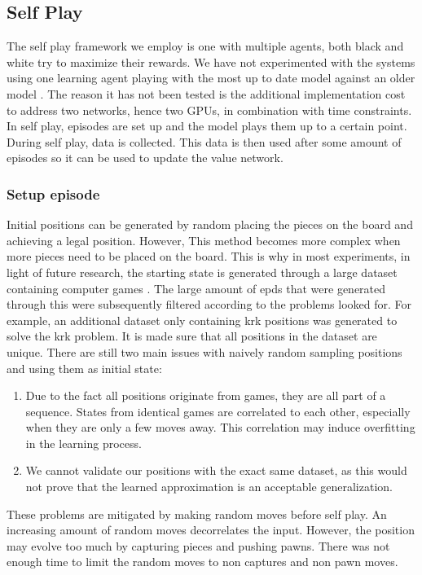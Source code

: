 \subsection{Self Play}
\label{subsec:selfplay}

The self play framework we employ is one with multiple agents, both black and white try to maximize their rewards. We have not experimented with the systems using one learning agent playing with the most up to date model against an older model \cite{alphago16,dddqn15}. The reason it has not been tested is the additional implementation cost to address two networks, hence two GPUs, in combination with time constraints.\\

In self play, episodes are set up and the model plays them up to a certain point. During self play, data is collected. This data is then used after some amount of episodes so it can be used to update the value network.

\subsubsection*{Setup episode}
Initial positions can be generated by random placing the pieces on the board and achieving a legal position. However, This method becomes more complex when more pieces need to be placed on the board. This is why in most experiments, in light of future research, the starting state is generated through a large dataset containing computer games \cite{dataset}. The large amount of \gls{epd}s that were generated through this were subsequently filtered according to the problems looked for. For example, an additional dataset only containing \gls{krk} positions was generated to solve the \gls{krk} problem.  It is made sure that all positions in the dataset are unique. There are still two main issues with naively random sampling positions and using them as initial state:
\begin{enumerate}
\item Due to the fact all positions originate from games, they are all part of a sequence. States from identical games are correlated to each other, especially when they are only a few moves away. This correlation may induce overfitting in the learning process.
\item We cannot validate our positions with the exact same dataset, as this would not prove that the learned approximation is an acceptable generalization.
\end{enumerate}
These problems are mitigated by making random moves before self play. An increasing amount of random moves decorrelates the input. However, the position may evolve too much by capturing pieces and pushing pawns. There was not enough time to limit the random moves to non captures and non pawn moves.\\

